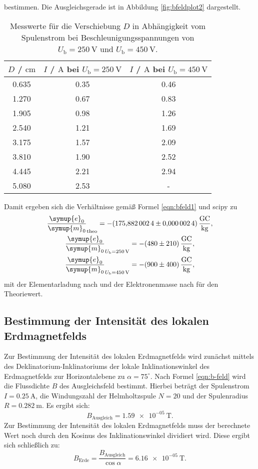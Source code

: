 bestimmen. Die Ausgleichsgerade ist in Abbildung \ref{fig:bfeldplot2} dargestellt.
\begin{table}
	\caption{Messwerte für die Verschiebung $D$ in Abhängigkeit vom Spulenstrom bei Beschleunigungsspannungen von $U_{\mathrm{b}}=\SI{250}{\volt}$ und $U_{\mathrm{b}}=\SI{450}{\volt}$.}
	\label{tab:bfeldtab}
	\centering
	\begin{tabular}{ccc}
	\toprule
		$D$ / $\si{\centi\meter}$ & $I$ / $\si{\ampere}$ bei $U_{\mathrm{b}}=\SI{250}{\volt}$ & $I$ / $\si{\ampere}$ bei $U_{\mathrm{b}}=\SI{450}{\volt}$ \\
	\midrule
		0.635 & 0.35 & 0.46 \\
		1.270 & 0.67 & 0.83 \\
		1.905 & 0.98 & 1.26 \\
		2.540 & 1.21 & 1.69 \\
		3.175 & 1.57 & 2.09 \\
		3.810 & 1.90 & 2.52 \\
		4.445 & 2.21 & 2.94 \\
		5.080 & 2.53 & - \\
	\bottomrule
	\end{tabular}
\end{table}
Damit ergeben sich die Verhältnisse gemäß Formel \eqref{eqn:bfeld1} und scipy \cite{scipy} zu
\begin{gather*}
	\frac{\symup{e}_0}{\symup{m}_0}_{\mathrm{theo}} =  -\SI{175.8820024(24)}{\giga\coulomb\per\kilo\gram} \mathrm{,} \\
	\frac{\symup{e}_0}{\symup{m}_0}_{U_{\mathrm{b}} = \SI{250}{\volt}} = -\SI{480(210)}{\giga\coulomb\per\kilo\gram} \mathrm{,} \\
	\frac{\symup{e}_0}{\symup{m}_0}_{U_{\mathrm{b}} = \SI{450}{\volt}} = -\SI{900(400)}{\giga\coulomb\per\kilo\gram} \mathrm{,}
\end{gather*}
mit der Elementarladung nach \cite{e} und der Elektronenmasse nach \cite{m} für den Theoriewert.
\subsection{Bestimmung der Intensität des lokalen Erdmagnetfelds}
Zur Bestimmung der Intensität des lokalen Erdmagnetfelds wird zunächst mittels des Deklinatorium-Inklinatoriums der lokale Inklinationswinkel des Erdmagnetfelds zur Horizontalebene zu $\alpha=75^\circ$.
Nach Formel \eqref{eqn:b-feld} wird die Flussdichte $B$ des Ausgleichsfeld bestimmt.
Hierbei beträgt der Spulenstrom $I=\SI{0.25}{\ampere}$, die Windungszahl der Helmholtzspule $N=20$ und der Spulenradius $R=\SI{0.282}{\meter}$.
Es ergibt sich:
\begin{equation}
  B_\mathrm{Ausgleich}=\SI{1.59e-05}{\tesla} \text{.}
\end{equation}
Zur Bestimmung der Intensität des lokalen Erdmagnetfelds muss der berechnete Wert noch durch den Kosinus des Inklinationswinkel dividiert wird.
Diese ergibt sich schließlich zu:
\begin{equation}
  B_\mathrm{Erde}=\frac{B_\mathrm{Ausgleich}}{\cos{\alpha}}=\SI{6.16e-05}{\tesla} \text{.}
\end{equation}
